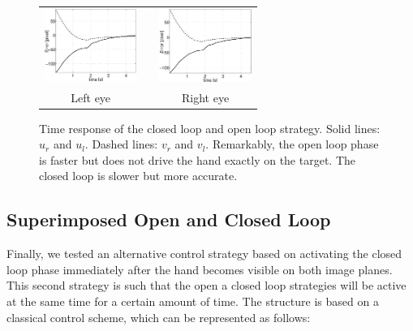   \begin{figure}[th!]
  \begin{center}
	\begin{tabular}{ccc}
	  \parbox{30mm}{\includegraphics[width=30mm]{Figure/LeftEyeOpenClosedLoopTimeResponse.eps}}  & \hspace{.1cm} &
	  \parbox{30mm}{\includegraphics[width=30mm]{Figure/RightEyeOpenClosedLoopTimeResponse.eps}}
	  \\
	  \parbox{30mm}{\centering Left eye } & \hspace{.1cm} & \parbox{50mm}{\centering Right eye }
  \end{tabular}
\end{center}
\caption{Time response of the closed loop and open loop strategy. Solid lines: $u_r$ and $u_l$. Dashed lines: $v_r$ and $v_l$. Remarkably, the open loop phase is faster but does not drive the hand exactly on the target. The closed loop is slower but more accurate.}\label{Fig:TimeResponseOpenClosedLoop}
\end{figure}


\subsection{Superimposed Open and Closed Loop}

Finally, we tested an alternative control strategy based on activating the closed loop 
phase immediately after the hand becomes visible on both image planes. This second strategy
is such that the open a closed loop strategies will be active at the same time for a 
certain amount of time. 
\newpage 
The structure is based on a classical control scheme, which can be represented as follows:

